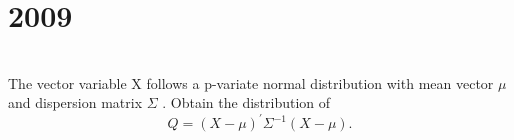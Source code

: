 \section*{2009}
\vspace{-.5cm}
\hrulefill \smallskip\\
 The vector variable X follows a p-variate normal distribution with mean vector $\mu$ and dispersion matrix $\Sigma$ . Obtain the distribution of
\[ Q = (X- \mu)^{'}\Sigma^{-1}(X - \mu). \]
